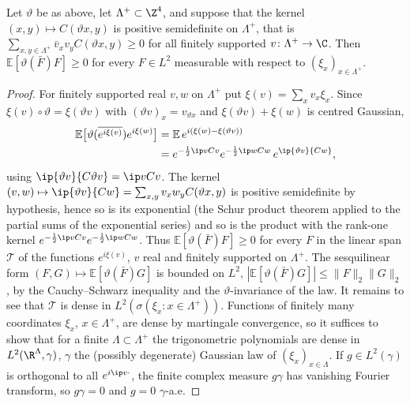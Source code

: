 \begin{lemma}\label{rN5:gaussrp}
Let $\vartheta$ be as above, let $\Lambda^+\subset\Z^4$, and suppose that
the kernel $(x,y)\mapsto
C(\vartheta x,y)$ is positive semidefinite on $\Lambda^+$, that is
$\sum_{x,y\in\Lambda^+}\bar v_xv_yC(\vartheta x,y)\ge0$ for all finitely supported
$v\colon\Lambda^+\to\C$. Then $\mathbb E[\vartheta(\bar F)F]\ge0$ for every
$F\in L^2$ measurable with respect to $(\xi_x)_{x\in\Lambda^+}$.
\end{lemma}

\begin{proof}
For finitely supported real $v,w$ on $\Lambda^+$ put $\xi(v)=\sum_xv_x\xi_x$.
Since $\xi(v)\circ\vartheta=\xi(\vartheta v)$ with $(\vartheta v)_x=v_{\vartheta
x}$ and $\xi(\vartheta v)+\xi(w)$ is centred Gaussian,
\[
\begin{split}
\mathbb E\bigl[\vartheta(\overline{e^{i\xi(v)}})e^{i\xi(w)}\bigr]&=\mathbb E\,
e^{i(\xi(w)-\xi(\vartheta v))}\\
&=e^{-\frac12\ip v{Cv}}e^{-\frac12\ip w{Cw}}\,e^{\ip{\vartheta v}{Cw}},
\end{split}
\]
using $\ip{\vartheta v}{C\vartheta v}=\ip v{Cv}$. The kernel $(v,w)\mapsto\ip
{\vartheta v}{Cw}=\sum_{x,y}v_xw_yC(\vartheta x,y)$ is positive semidefinite
by hypothesis, hence so is its exponential (the Schur product theorem applied
to the partial sums of the exponential series) and so is the product with the
rank-one kernel $e^{-\frac12\ip v{Cv}}e^{-\frac12\ip w{Cw}}$. Thus
$\mathbb E[\vartheta(\bar F)F]\ge0$ for every $F$ in the linear span
$\mathcal T$ of the functions $e^{i\xi(v)}$, $v$ real and finitely supported
on $\Lambda^+$. The sesquilinear form $(F,G)\mapsto\mathbb E[\vartheta(\bar
F)G]$ is bounded on $L^2$, $|\mathbb E[\vartheta(\bar F)G]|\le\|F\|_2\|G\|_2$,
by the Cauchy--Schwarz inequality and the $\vartheta$-invariance of the law.
It remains to see that $\mathcal T$ is dense in $L^2(\sigma(\xi_x:x\in\Lambda^+))$.
Functions of finitely many coordinates $\xi_x$, $x\in\Lambda^+$, are dense
by martingale convergence, so it suffices to show that for a finite
$\Lambda\subset\Lambda^+$ the trigonometric polynomials are dense in
$L^2(\R^\Lambda,\gamma)$, $\gamma$ the (possibly degenerate) Gaussian law of
$(\xi_x)_{x\in\Lambda}$. If $g\in L^2(\gamma)$ is orthogonal to all $e^{i\ip v\cdot}$,
the finite complex measure $g\gamma$ has vanishing Fourier transform, so
$g\gamma=0$ and $g=0$ $\gamma$-a.e.
\end{proof}

